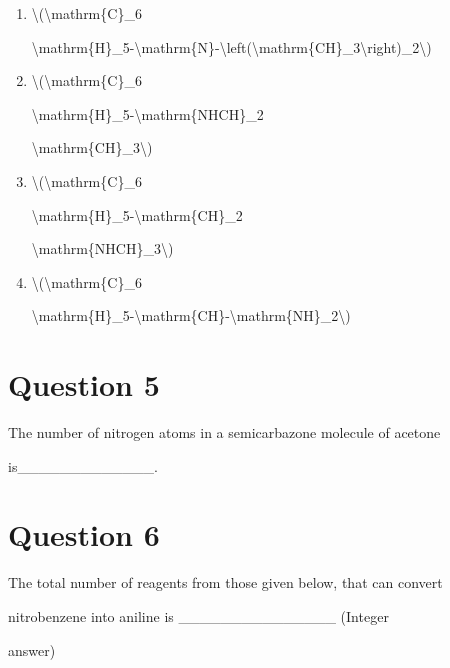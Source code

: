 \documentclass{article}
\begin{document}
\begin{enumerate}[label=(\alph*)]
\item \textbackslash(\textbackslash mathrm\{C\}\_6

\textbackslash mathrm\{H\}\_5-\textbackslash mathrm\{N\}-\textbackslash left(\textbackslash mathrm\{CH\}\_3\textbackslash right)\_2\textbackslash)


\item \textbackslash(\textbackslash mathrm\{C\}\_6

\textbackslash mathrm\{H\}\_5-\textbackslash mathrm\{NHCH\}\_2

\textbackslash mathrm\{CH\}\_3\textbackslash)


\item \textbackslash(\textbackslash mathrm\{C\}\_6

\textbackslash mathrm\{H\}\_5-\textbackslash mathrm\{CH\}\_2

\textbackslash mathrm\{NHCH\}\_3\textbackslash)


\item \textbackslash(\textbackslash mathrm\{C\}\_6

\textbackslash mathrm\{H\}\_5-\textbackslash mathrm\{CH\}-\textbackslash mathrm\{NH\}\_2\textbackslash)


\end{enumerate}
\newpage
\section*{Question 5}
The number of nitrogen atoms in a semicarbazone molecule of acetone

is\_\_\_\_\_\_\_\_\_\_\_\_\_.


\begin{enumerate}[label=(\alph*)]
\end{enumerate}
\newpage
\section*{Question 6}
The total number of reagents from those given below, that can convert

nitrobenzene into aniline is \_\_\_\_\_\_\_\_\_\_\_\_\_\_\_ (Integer

answer)
\end{document}
